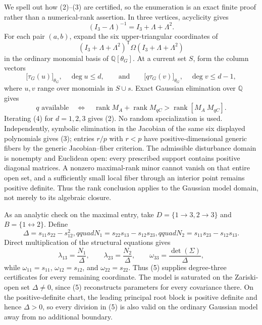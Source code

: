 We spell out how (2)--(3) are certified, so the enumeration is an exact finite proof rather than a numerical-rank assertion.  In three vertices, acyclicity gives
\[
 (I_3-\Lambda)^{-1}=I_3+\Lambda+\Lambda^2.
\]
For each pair \((a,b)\), expand the six upper-triangular coordinates of
\[
 (I_3+\Lambda+\Lambda^2)^{\mathsf T}\Omega(I_3+\Lambda+\Lambda^2)
\]
in the ordinary monomial basis of \(\mathbb Q[\theta_G]\).  At a current set \(S\), form the column vectors
\[
 \bigl[\tau_G(u)\bigr]_{\theta_G},\quad \deg u\leq d,
 \qquad\text{and}\qquad
 \bigl[q\tau_G(v)\bigr]_{\theta_G},\quad \deg v\leq d-1,
\]
where \(u,v\) range over monomials in \(S\cup s\).  Exact Gaussian elimination over \(\mathbb Q\) gives
\[
 q\text{ available}\quad\Longleftrightarrow\quad
 \operatorname{rank}M_A+\operatorname{rank}M_{qC}>
 \operatorname{rank}[M_A\ M_{qC}]. \tag{4}
\]
Iterating (4) for \(d=1,2,3\) gives (2).  No random specialization is used.  Independently, symbolic elimination in the Jacobian of the same six displayed polynomials gives (3); entries \(r/p\) with \(r<p\) have positive-dimensional generic fibers by the generic Jacobian--fiber criterion.
The admissible disturbance domain is nonempty and Euclidean open: every prescribed support contains positive diagonal matrices.  A nonzero maximal-rank minor cannot vanish on that entire open set, and a sufficiently small local fiber through an interior point remains positive definite.  Thus the rank conclusion applies to the Gaussian model domain, not merely to its algebraic closure.

As an analytic check on the maximal entry, take \(D=\{1\to3,2\to3\}\) and \(B=\{1\leftrightarrow2\}\).  Define
\[
 \Delta=s_{11}s_{22}-s_{12}^2,qquad
 N_1=s_{22}s_{13}-s_{12}s_{23},qquad
 N_2=s_{11}s_{23}-s_{12}s_{13}.
\]
Direct multiplication of the structural equations gives
\[
 \lambda_{13}=\frac{N_1}{\Delta},\qquad
 \lambda_{23}=\frac{N_2}{\Delta},\qquad
 \omega_{33}=\frac{\det(\Sigma)}{\Delta}, \tag{5}
\]
while \(\omega_{11}=s_{11}\), \(\omega_{12}=s_{12}\), and \(\omega_{22}=s_{22}\).  Thus (5) supplies degree-three certificates for every remaining coordinate.  The model is saturated on the Zariski-open set \(\Delta\neq0\), since (5) reconstructs parameters for every covariance there.
On the positive-definite chart, the leading principal root block is positive definite and hence \(\Delta>0\), so every division in (5) is also valid on the ordinary Gaussian model away from no additional boundary.

